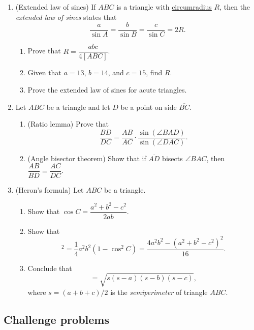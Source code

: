 \begin{enumerate}
\begin{enumerate}
\end{enumerate}
\item (Extended law of sines) If $ABC$ is a triangle with \href{https://en.wikipedia.org/wiki/Circumcircle}{circumradius} $R$, then the \emph{extended law of sines} states that
\begin{equation*}
\frac{a}{\sin A} = \frac{b}{\sin B} = \frac{c}{\sin C} = 2R.
\end{equation*}
\begin{enumerate}
\item Prove that $R = \dfrac{abc}{4[ABC]}$.
\item Given that $a = 13$, $b = 14$, and $c = 15$, find $R$.
\item Prove the extended law of sines for acute triangles.
\end{enumerate}
\item Let $ABC$ be a triangle and let $D$ be a point on side $\overline{BC}$.
\begin{enumerate}
\item (Ratio lemma) Prove that
\begin{equation*}
\frac{BD}{DC} = \frac{AB}{AC}\cdot\frac{\sin(\angle BAD)}{\sin(\angle DAC)}.
\end{equation*}
\item (Angle bisector theorem) Show that if $\overline{AD}$ bisects $\angle BAC$, then $\dfrac{AB}{BD} = \dfrac{AC}{DC}$.
\end{enumerate}
\item (Heron's formula) Let $ABC$ be a triangle.
\begin{enumerate}
\item Show that $\cos C = \dfrac{a^2 + b^2 - c^2}{2ab}$.
\item Show that
\begin{equation*}
[ABC]^2 = \frac{1}{4}a^2b^2(1 - \cos^2 C) = \frac{4a^2b^2 - (a^2 + b^2 - c^2)^2}{16}.
\end{equation*}
\item Conclude that
\begin{equation*}
[ABC] = \sqrt{s(s - a)(s - b)(s - c)},
\end{equation*}
where $s = (a + b + c)/2$ is the \emph{semiperimeter} of triangle $ABC$.
\end{enumerate}
\end{enumerate}


\subsection{Challenge problems}

